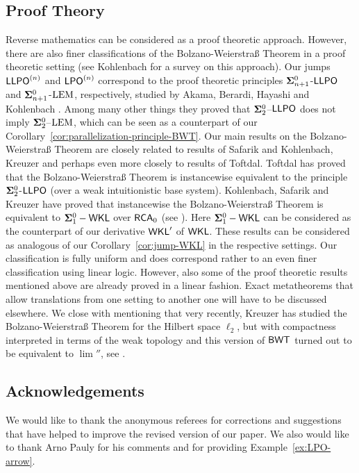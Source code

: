 \documentclass[a4paper]{amsart}
\def\ll#1{\ell_{#1}}
\newcommand{\SO}[1]{{{\bf\Sigma}^0_{#1}}}
\def\LPO{\text{\rm\sffamily LPO}}
\def\LLPO{\text{\rm\sffamily LLPO}}
\def\WKL{\text{\rm\sffamily WKL}}
\def\RCA{\text{\rm\sffamily RCA}}
\def\BWT{\text{\rm\sffamily BWT}}
\def\LPO{\mbox{\rm\sffamily LPO}}
\def\LLPO{\mbox{\rm\sffamily LLPO}}
\theoremstyle{definition}
\begin{document}
\subsection{Proof Theory}

Reverse mathematics can be considered as a proof theoretic approach. However,
there are also finer classifications of the Bolzano-Weierstra\ss{} Theorem
in a proof theoretic setting (see Kohlenbach \cite{Koh08a} for a survey on this approach).
Our jumps $\LLPO^{(n)}$ and $\LPO^{(n)}$ correspond to the
proof theoretic principles $\SO{n+1}$-$\LLPO$ and $\SO{n+1}$-${\rm LEM}$, respectively, 
studied by Akama, Berardi, Hayashi and Kohlenbach \cite{ABHK04}.
Among many other things they proved that $\SO{2}$--$\LLPO$ does not imply $\SO{2}$--${\rm LEM}$,
which can be seen as a counterpart of our Corollary~\ref{cor:parallelization-principle-BWT}.
Our main results on the Bolzano-Weierstra\ss{} Theorem are closely related to results
of Safarik and Kohlenbach, Kreuzer and perhaps even more closely to results of Toftdal.
Toftdal \cite{Tof04} has proved that the Bolzano-Weierstra\ss{} Theorem is instancewise
equivalent to the principle $\SO{2}$-$\LLPO$ (over a weak intuitionistic base system).
Kohlenbach, Safarik and Kreuzer have proved that instancewise the Bolzano-Weierstra\ss{} Theorem 
is equivalent to $\SO{1}-\WKL$ over $\RCA_0$ (see \cite{SK10,Kre11}). Here $\SO{1}-\WKL$ can be considered as the counterpart
of our derivative $\WKL'$ of $\WKL$. 
These results can be considered as analogous of our Corollary~\ref{cor:jump-WKL} in the respective settings.
Our classification is fully uniform and does correspond rather to an even finer classification using linear logic.
However, also some of the proof theoretic results mentioned above are already proved in a linear fashion.
Exact metatheorems that allow translations from one setting to another one will have to be discussed elsewhere.
We close with mentioning that very recently, Kreuzer has studied the Bolzano-Weierstra\ss{} Theorem for the
Hilbert space $\ll{2}$, but with compactness interpreted in terms of the weak topology and
this version of $\BWT$ turned out to be equivalent to $\lim''$, see \cite{Kre11a}.


\subsection*{Acknowledgements}
We would like to thank the anonymous referees for corrections and suggestions that 
have helped to improve the revised version of our paper. 
We also would like to thank Arno Pauly for his comments and for providing 
Example~\ref{ex:LPO-arrow}.




\end{document}
